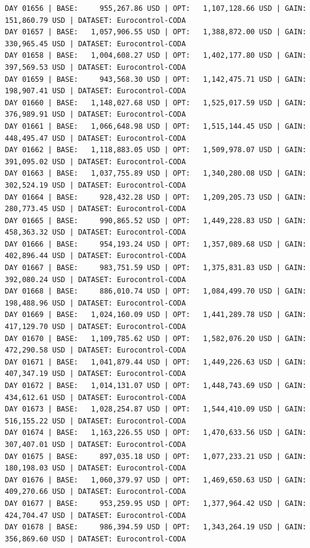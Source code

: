 \documentclass[11pt,a4paper]{article}
\begin{document}
\begin{verbatim}
DAY 01656 | BASE:     955,267.86 USD | OPT:   1,107,128.66 USD | GAIN: 151,860.79 USD | DATASET: Eurocontrol-CODA
DAY 01657 | BASE:   1,057,906.55 USD | OPT:   1,388,872.00 USD | GAIN: 330,965.45 USD | DATASET: Eurocontrol-CODA
DAY 01658 | BASE:   1,004,608.27 USD | OPT:   1,402,177.80 USD | GAIN: 397,569.53 USD | DATASET: Eurocontrol-CODA
DAY 01659 | BASE:     943,568.30 USD | OPT:   1,142,475.71 USD | GAIN: 198,907.41 USD | DATASET: Eurocontrol-CODA
DAY 01660 | BASE:   1,148,027.68 USD | OPT:   1,525,017.59 USD | GAIN: 376,989.91 USD | DATASET: Eurocontrol-CODA
DAY 01661 | BASE:   1,066,648.98 USD | OPT:   1,515,144.45 USD | GAIN: 448,495.47 USD | DATASET: Eurocontrol-CODA
DAY 01662 | BASE:   1,118,883.05 USD | OPT:   1,509,978.07 USD | GAIN: 391,095.02 USD | DATASET: Eurocontrol-CODA
DAY 01663 | BASE:   1,037,755.89 USD | OPT:   1,340,280.08 USD | GAIN: 302,524.19 USD | DATASET: Eurocontrol-CODA
DAY 01664 | BASE:     928,432.28 USD | OPT:   1,209,205.73 USD | GAIN: 280,773.45 USD | DATASET: Eurocontrol-CODA
DAY 01665 | BASE:     990,865.52 USD | OPT:   1,449,228.83 USD | GAIN: 458,363.32 USD | DATASET: Eurocontrol-CODA
DAY 01666 | BASE:     954,193.24 USD | OPT:   1,357,089.68 USD | GAIN: 402,896.44 USD | DATASET: Eurocontrol-CODA
DAY 01667 | BASE:     983,751.59 USD | OPT:   1,375,831.83 USD | GAIN: 392,080.24 USD | DATASET: Eurocontrol-CODA
DAY 01668 | BASE:     886,010.74 USD | OPT:   1,084,499.70 USD | GAIN: 198,488.96 USD | DATASET: Eurocontrol-CODA
DAY 01669 | BASE:   1,024,160.09 USD | OPT:   1,441,289.78 USD | GAIN: 417,129.70 USD | DATASET: Eurocontrol-CODA
DAY 01670 | BASE:   1,109,785.62 USD | OPT:   1,582,076.20 USD | GAIN: 472,290.58 USD | DATASET: Eurocontrol-CODA
DAY 01671 | BASE:   1,041,879.44 USD | OPT:   1,449,226.63 USD | GAIN: 407,347.19 USD | DATASET: Eurocontrol-CODA
DAY 01672 | BASE:   1,014,131.07 USD | OPT:   1,448,743.69 USD | GAIN: 434,612.61 USD | DATASET: Eurocontrol-CODA
DAY 01673 | BASE:   1,028,254.87 USD | OPT:   1,544,410.09 USD | GAIN: 516,155.22 USD | DATASET: Eurocontrol-CODA
DAY 01674 | BASE:   1,163,226.55 USD | OPT:   1,470,633.56 USD | GAIN: 307,407.01 USD | DATASET: Eurocontrol-CODA
DAY 01675 | BASE:     897,035.18 USD | OPT:   1,077,233.21 USD | GAIN: 180,198.03 USD | DATASET: Eurocontrol-CODA
DAY 01676 | BASE:   1,060,379.97 USD | OPT:   1,469,650.63 USD | GAIN: 409,270.66 USD | DATASET: Eurocontrol-CODA
DAY 01677 | BASE:     953,259.95 USD | OPT:   1,377,964.42 USD | GAIN: 424,704.47 USD | DATASET: Eurocontrol-CODA
DAY 01678 | BASE:     986,394.59 USD | OPT:   1,343,264.19 USD | GAIN: 356,869.60 USD | DATASET: Eurocontrol-CODA

\end{verbatim}
\end{document}
